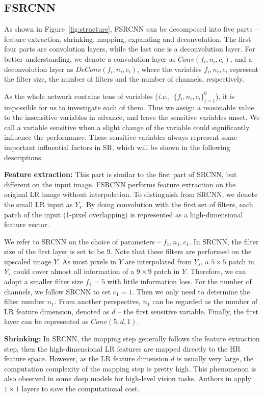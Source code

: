 \documentclass[runningheads]{llncs}
\newcommand{\ie}{\emph{i.e.,}}
\begin{document}
\subsection{FSRCNN}
As shown in Figure~\ref{fig:structure}, FSRCNN can be decomposed into five parts -- feature extraction, shrinking, mapping, expanding and deconvolution. The first four parts are convolution layers, while the last one is a deconvolution layer. For better understanding, we denote a convolution layer as $Conv(f_i,n_i,c_i)$, and a deconvolution layer as $DeConv(f_i,n_i,c_i)$, where the variables $f_i,n_i,c_i$ represent the filter size, the number of filters and the number of channels, respectively.

As the whole network contains tens of variables (\ie~$\{f_i,n_i,c_i\}_{i=1}^6$), it is impossible for us to investigate each of them. Thus we assign a reasonable value to the insensitive variables in advance, and leave the sensitive variables unset. We call a variable sensitive when a slight change of the variable could significantly influence the performance. These sensitive variables always represent some important influential factors in SR, which will be shown in the following descriptions.

\noindent
\textbf{Feature extraction:} This part is similar to the first part of SRCNN, but different on the input image. FSRCNN performs feature extraction on the original LR image without interpolation. To distinguish from SRCNN, we denote the small LR input as $Y_s$. By doing convolution with the first set of filters, each patch of the input (1-pixel overlapping) is represented as a high-dimensional feature vector.

We refer to SRCNN on the choice of parameters -- $f_1,n_1,c_1$. In SRCNN, the filter size of the first layer is set to be 9. Note that these filters are performed on the upscaled image $Y$. As most pixels in $Y$ are interpolated from $Y_s$, a $5\times 5$ patch in $Y_s$ could cover almost all information of a $9\times 9$ patch in $Y$. Therefore, we can adopt a smaller filter size $f_1=5$ with little information loss. For the number of channels, we follow SRCNN to set $c_1=1$. Then we only need to determine the filter number $n_1$. From another perspective, $n_1$ can be regarded as the number of LR feature dimension, denoted as $d$ -- the first sensitive variable. Finally, the first layer can be represented as $Conv(5,d,1)$.

\noindent
\textbf{Shrinking:} In SRCNN, the mapping step generally follows the feature extraction step, then the high-dimensional LR features are mapped directly to the HR feature space. However, as the LR feature dimension $d$ is usually very large, the computation complexity of the mapping step is pretty high. This phenomenon is also observed in some deep models for high-level vision tasks.
Authors in \cite{Lin2014} apply $1\times 1$ layers to save the computational cost.
\end{document}
